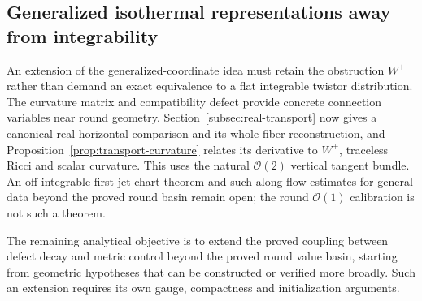 \documentclass[11pt]{article}
\numberwithin{equation}{section}
\theoremstyle{definition}
\theoremstyle{remark}
\begin{document}
\subsection{Generalized isothermal representations away from integrability}
An extension of the generalized-coordinate idea must retain the obstruction \(W^+\) rather than demand an exact equivalence to a flat integrable twistor distribution. The curvature matrix and compatibility defect provide concrete connection variables near round geometry. Section~\ref{subsec:real-transport} now gives a canonical real horizontal comparison and its whole-fiber reconstruction, and Proposition~\ref{prop:transport-curvature} relates its derivative to $W^+$, traceless Ricci and scalar curvature. This uses the natural $\mathcal O(2)$ vertical tangent bundle. An off-integrable first-jet chart theorem and such along-flow estimates for general data beyond the proved round basin remain open; the round $\mathcal O(1)$ calibration is not such a theorem.

The remaining analytical objective is to extend the proved coupling between defect decay and metric control beyond the proved round value basin, starting from geometric hypotheses that can be constructed or verified more broadly. Such an extension requires its own gauge, compactness and initialization arguments.
\end{document}
